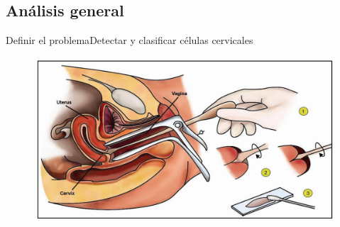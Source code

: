 \documentclass{beamer}
\begin{document}
    \subsection{Análisis general}
    \begin{frame}{Definir el problema}{Detectar y clasificar células cervicales}
        \begin{figure}[]
            \centering
            \includegraphics[width=1\textwidth]{papsmear.jpg}
        \end{figure}
    \end{frame}
\end{document}
